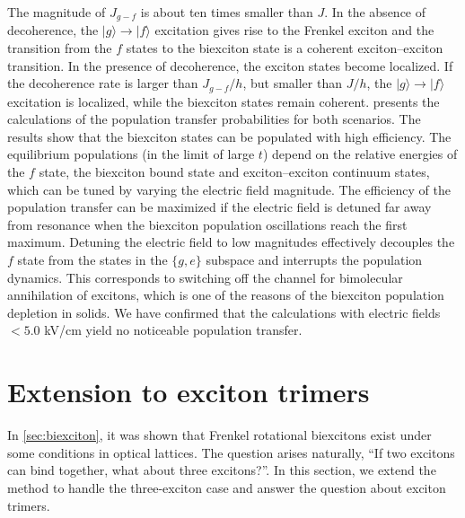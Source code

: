 The magnitude of $J_{g-f}$ is about ten times smaller than $J$.
 In the absence of decoherence, the $| g \rangle \rightarrow | f \rangle$ excitation gives rise to the Frenkel exciton and
 the transition from the $f$ states to 
 the biexciton state is a coherent exciton--exciton transition. In the presence of decoherence, the exciton states
 become localized. If the decoherence rate is larger than $J_{g-f}/h$, but smaller than $J/h$, the
 $| g \rangle \rightarrow | f \rangle$ excitation is localized, while the biexciton states remain coherent.
  presents the calculations of the population transfer probabilities for both
 scenarios. The results show that the biexciton states can be populated with high efficiency. The equilibrium
 populations (in the limit of large $t$) depend on the relative energies of the $f$ state, the biexciton bound state and
 exciton--exciton continuum states, which can be tuned by varying the electric field magnitude. 
The efficiency of the population transfer can be maximized if the electric field is detuned far away from resonance
 when the biexciton population oscillations reach the first maximum. Detuning the electric field to low magnitudes
 effectively decouples the $f$ state from the states in the $\{g,e\}$ subspace and interrupts the population dynamics.
 This corresponds to switching off the channel for bimolecular annihilation of excitons, which is one of the reasons of
 the biexciton population depletion in solids. We have confirmed that the calculations with electric fields $< 5.0$
 kV/cm yield no  noticeable population transfer. 



\section{Extension to exciton trimers}
\label{sec:trimers}
In \autoref{sec:biexciton}, it was shown that Frenkel rotational biexcitons exist under some conditions in optical lattices. 
The question arises naturally, ``If two excitons can bind together, what about three excitons?''. In this section, we
extend the method to handle the three-exciton case and answer the question about exciton trimers. 

